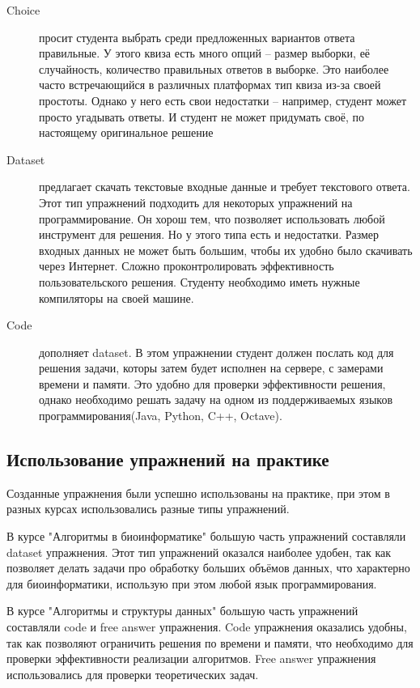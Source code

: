 \documentclass{matmex-diploma-custom}
\begin{document}
\begin{description}
\item[Choice] просит студента выбрать среди предложенных вариантов
  ответа правильные. У этого квиза есть много опций -- размер выборки,
  её случайность, количество правильных ответов в выборке. Это
  наиболее часто встречающийся в различных платформах тип квиза из-за
  своей простоты. Однако у него есть свои недостатки -- например,
  студент может просто угадывать ответы. И студент не может придумать
  своё, по настоящему оригинальное решение

\item[Dataset] предлагает скачать текстовые входные данные и требует
  текстового ответа. Этот тип упражнений подходить для некоторых
  упражнений на программирование. Он хорош тем, что позволяет
  использовать любой инструмент для решения. Но у этого типа есть и
  недостатки. Размер входных данных не может быть большим, чтобы их
  удобно было скачивать через Интернет. Сложно проконтролировать
  эффективность пользовательского решения. Студенту необходимо иметь
  нужные компиляторы на своей машине.

\item[Code] дополняет dataset. В этом упражнении студент должен
  послать код для решения задачи, которы затем будет исполнен на
  сервере, с замерами времени и памяти. Это удобно для проверки
  эффективности решения, однако необходимо решать задачу на одном из
  поддерживаемых языков программирования(Java, Python, C++, Octave).
\end{description}

\subsection{Использование упражнений на практике}

Созданные упражнения были успешно использованы на практике, при этом в
разных курсах использовались разные типы упражнений.

В курсе "Алгоритмы в биоинформатике" большую часть упражнений
составляли dataset упражнения. Этот тип упражнений оказался наиболее
удобен, так как позволяет делать задачи про обработку больших объёмов
данных, что характерно для биоинформатики, использую при этом любой
язык программирования.

В курсе "Алгоритмы и структуры данных" большую часть упражнений
составляли code и free answer упражнения. Code упражнения оказались
удобны, так как позволяют ограничить решения по времени и памяти, что
необходимо для проверки эффективности реализации алгоритмов. Free
answer упражнения использовались для проверки теоретических задач.
\end{document}

